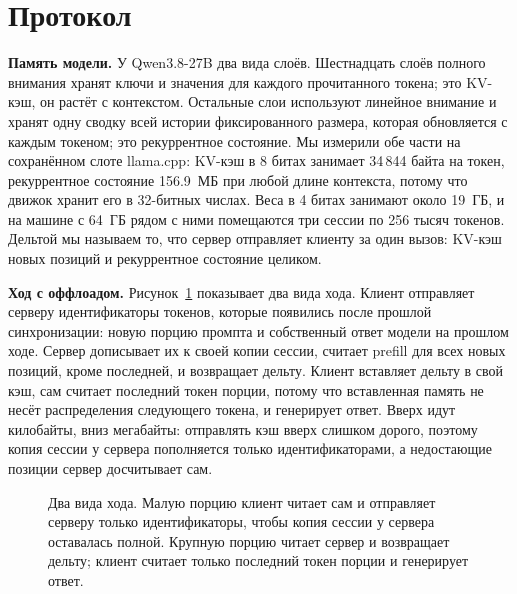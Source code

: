 \section{Протокол}
\label{sec:architecture}

\textbf{Память модели.} У Qwen3.8-27B два вида слоёв. Шестнадцать слоёв полного внимания хранят ключи и значения для
каждого прочитанного токена; это KV-кэш, он растёт с контекстом. Остальные слои используют линейное внимание и
хранят одну сводку всей истории фиксированного размера, которая обновляется с каждым токеном; это рекуррентное
состояние. Мы измерили обе части на сохранённом слоте llama.cpp: KV-кэш в 8 битах занимает 34\,844 байта на токен,
рекуррентное состояние 156.9~МБ при любой длине контекста, потому что движок хранит его в 32-битных числах. Веса в 4
битах занимают около 19~ГБ, и на машине с 64~ГБ рядом с ними помещаются три сессии по 256 тысяч токенов. Дельтой мы
называем то, что сервер отправляет клиенту за один вызов: KV-кэш новых позиций и рекуррентное состояние целиком.

\textbf{Ход с оффлоадом.} Рисунок~\ref{fig:sequence} показывает два вида хода. Клиент отправляет серверу
идентификаторы токенов, которые появились после прошлой синхронизации: новую порцию промпта и собственный ответ модели
на прошлом ходе. Сервер дописывает их к своей копии сессии, считает prefill для всех новых позиций, кроме последней, и
возвращает дельту. Клиент вставляет дельту в свой кэш, сам считает последний токен порции, потому что вставленная
память не несёт распределения следующего токена, и генерирует ответ. Вверх идут килобайты, вниз мегабайты:
отправлять кэш вверх слишком дорого, поэтому копия сессии у сервера пополняется только идентификаторами, а
недостающие позиции сервер досчитывает сам.

\begin{figure}[t]
\centering
{}
\caption{Два вида хода. Малую порцию клиент читает сам и отправляет серверу только идентификаторы, чтобы копия сессии
у сервера оставалась полной. Крупную порцию читает сервер и возвращает дельту; клиент считает только последний токен
порции и генерирует ответ.}
\label{fig:sequence}
\end{figure}

